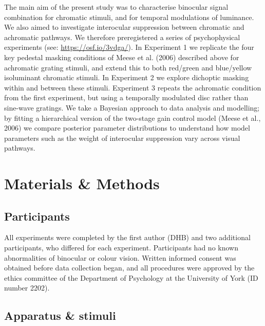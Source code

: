 \documentclass[
  letterpaper,
  DIV=11,
  numbers=noendperiod]{scrartcl}
\begin{document}
The main aim of the present study was to characterise binocular signal
combination for chromatic stimuli, and for temporal modulations of
luminance. We also aimed to investigate interocular suppression between
chromatic and achromatic pathways. We therefore preregistered a series
of psychophysical experiments (see: \url{https://osf.io/3vdga/}). In
Experiment 1 we replicate the four key pedestal masking conditions of
Meese et al. (2006) described above for achromatic grating stimuli, and
extend this to both red/green and blue/yellow isoluminant chromatic
stimuli. In Experiment 2 we explore dichoptic masking within and between
these stimuli. Experiment 3 repeats the achromatic condition from the
first experiment, but using a temporally modulated disc rather than
sine-wave gratings. We take a Bayesian approach to data analysis and
modelling; by fitting a hierarchical version of the two-stage gain
control model (Meese et al., 2006) we compare posterior parameter
distributions to understand how model parameters such as the weight of
interocular suppression vary across visual pathways.

\hypertarget{materials-methods}{%
\section{Materials \& Methods}\label{materials-methods}}

\hypertarget{participants}{%
\subsection{Participants}\label{participants}}

All experiments were completed by the first author (DHB) and two
additional participants, who differed for each experiment. Participants
had no known abnormalities of binocular or colour vision. Written
informed consent was obtained before data collection began, and all
procedures were approved by the ethics committee of the Department of
Psychology at the University of York (ID number 2202).

\hypertarget{apparatus-stimuli}{%
\subsection{Apparatus \& stimuli}\label{apparatus-stimuli}}
\end{document}
